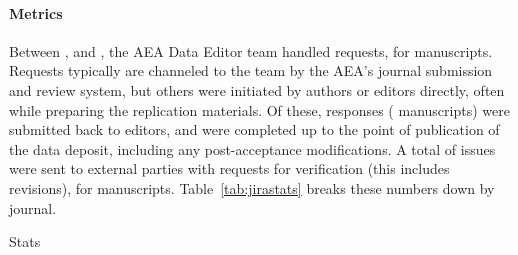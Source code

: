 \documentclass[PP]{AEA}
\begin{document}
\paragraph{Metrics}

Between \firstday{}, and \lastday{}, the AEA Data Editor team  handled
\jiraissues{} requests,  for \jiramcs{} manuscripts. Requests typically are channeled to the team by the AEA's journal submission and review system, but others were initiated by authors or editors directly, often while preparing the replication materials. Of these,  responses \jiraissuescplt{} (\jiramcscplt{} manuscripts) were submitted back to editors, and \jiramcspending{} were completed up to the point of publication of the data deposit, including any post-acceptance modifications. A total of \jiraexternal{} issues were sent to external parties with requests for verification (this includes revisions), for \jiramcsexternal{} manuscripts. Table~\ref{tab:jirastats} breaks these numbers down by journal.
%

\begin{table}[]
    \caption{Stats}
    \label{tab:jirastats}
    \begin{threeparttable}
    \centering
    
    \end{threeparttable}
\end{table}
\end{document}
